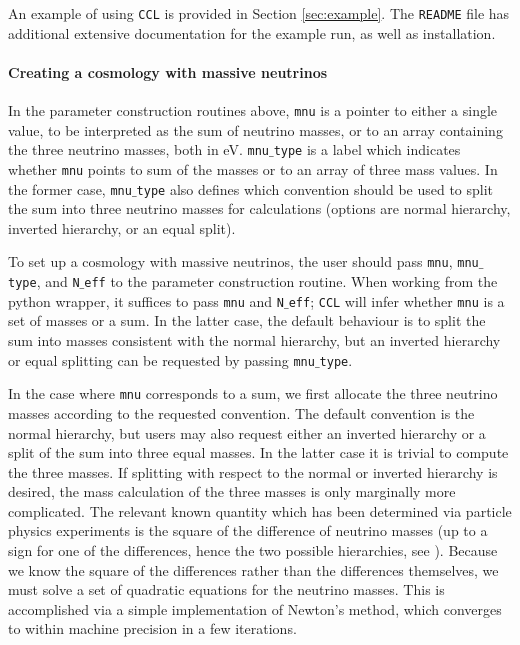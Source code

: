 \documentclass[\docopts]{\docclass}
\newcommand{\ccl}{{\tt CCL}\xspace}
\begin{document}
An example of using \ccl is provided in Section \ref{sec:example}. The {\tt README} file has additional extensive documentation for the example run, as well as installation.

\paragraph{Creating a cosmology with massive neutrinos}
In the parameter construction routines above, {\tt mnu} is a pointer to either a single value, to be interpreted as the sum of neutrino masses, or to an array containing the three neutrino masses, both in eV. {\tt mnu$\_$type} is a label which indicates whether {\tt mnu} points to sum of the masses or to an array of three mass values. In the former case, {\tt mnu$\_$type} also defines which convention should be used to split the sum into three neutrino masses for calculations (options are normal hierarchy, inverted hierarchy, or an equal split).

To set up a cosmology with massive neutrinos, the user should pass {\tt mnu}, {\tt mnu$\_$type}, and {\tt N$\_$eff} to the parameter construction routine. When working from the python wrapper, it suffices to pass {\tt mnu} and {\tt N$\_$eff}; \ccl will infer whether {\tt mnu} is a set of masses or a sum. In the latter case, the default behaviour is to split the sum into masses consistent with the normal hierarchy, but an inverted hierarchy or equal splitting can be requested by passing {\tt mnu$\_$type}.

In the case where {\tt mnu} corresponds to a sum, we first allocate the three neutrino masses according to the requested convention. The default convention is the normal hierarchy, but users may also request either an inverted hierarchy or a split of the sum into three equal masses. In the latter case it is trivial to compute the three masses. If splitting with respect to the normal or inverted hierarchy is desired, the mass calculation of the three masses is only marginally more complicated. The relevant known quantity which has been determined via particle physics experiments is the square of the difference of neutrino masses (up to a sign for one of the differences, hence the two possible hierarchies, see \citealt{Lesgourgues2012, Gerbino2017}). Because we know the square of the differences rather than the differences themselves, we must solve a set of quadratic equations for the neutrino masses. This is accomplished via a simple implementation of Newton's method, which converges to within machine precision in a few iterations.
\end{document}
